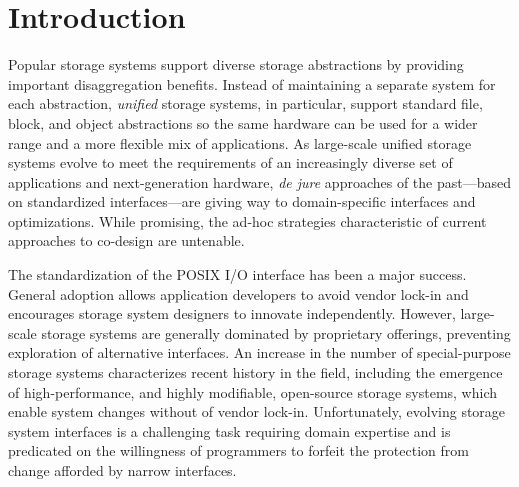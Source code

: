 \section{Introduction}
\label{sec:intro}

Popular storage systems support diverse storage abstractions by
providing important disaggregation benefits. Instead of maintaining
a separate system for each abstraction, \emph{unified} storage
systems, in particular, support standard file, block, and object abstractions so the same
hardware can be used for a wider range and a more flexible mix of applications. 
As large-scale unified storage systems evolve to meet the requirements 
of an increasingly diverse set of applications and next-generation hardware, \emph{de jure}
approaches of the past---based on standardized interfaces---are giving way to
domain-specific interfaces and optimizations. While promising, the ad-hoc strategies characteristic of 
current approaches to co-design are untenable.

The standardization of the POSIX I/O interface has been a major success. General adoption
allows application developers to avoid vendor lock-in and encourages storage system
designers to innovate independently. However, large-scale storage systems are generally dominated 
by proprietary offerings, preventing exploration of alternative
interfaces. An increase in the number of special-purpose storage systems characterizes recent history
in the field, including the emergence of high-performance, and highly modifiable, open-source storage systems, 
which enable system changes without of vendor lock-in. Unfortunately, evolving storage system
interfaces is a challenging task requiring domain expertise and is predicated on the willingness of
programmers to forfeit the protection from change afforded by narrow
interfaces.

